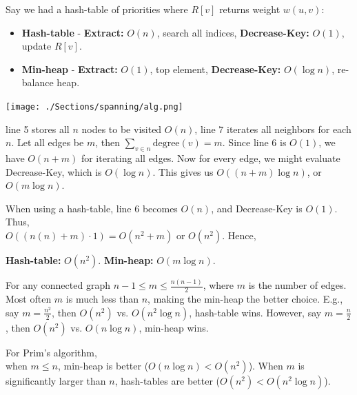 \newpage
\begin{Proof}
    Say we had a hash-table of priorities where $R[v]$ returns weight $w(u,v)$:
    \begin{itemize}
        \item \textbf{Hash-table} - \textbf{Extract:} $O(n)$, search all indices, \textbf{Decrease-Key:} $O(1)$, update $R[v]$.
        \item \textbf{Min-heap} - \textbf{Extract:} $O(1)$, top element, \textbf{Decrease-Key:} $O(\log n)$, re-balance heap.
    \end{itemize}
    \begin{center}
    \texttt{[image: ./Sections/spanning/alg.png]}
    \end{center}

    line 5 stores all $n$ nodes to be visited $O(n)$, line 7 iterates all neighbors for each $n$. Let all edges be $m$, then $\sum_{v \in n} \text{degree}(v)=m$.
    Since line 6 is $O(1)$, we have $O(n+m)$ for iterating all edges. Now for every edge, we might evaluate Decrease-Key, which is $O(\log n)$. This gives us 
    $O((n+m)\log n)$, or $O(m\log n)$.
    
    When using a hash-table, line 6 becomes $O(n)$, and Decrease-Key is $O(1)$. Thus,\\
    $O((n(n)+m)\cdot 1)= O(n^2+m)$ or $O(n^2)$. Hence,

    \begin{center}
        \textbf{Hash-table:} $O(n^2)$. \textbf{Min-heap:} $O(m\log n)$.\\
    \end{center}

    \noindent
    For any connected graph $n-1\leq m \leq \frac{n(n-1)}{2}$, where $m$ is the number of edges. Most often $m$ is much less than $n$, making the min-heap the better choice.
    E.g., say $m=\frac{n^2}{2}$, then $O(n^2)$ vs. $O(n^2\log n)$, hash-table wins. However, say $m=\frac{n}{2}$, then $O(n^2)$ vs. $O(n\log n)$, min-heap wins.
\end{Proof}

\begin{theo}

    For Prim's algorithm,\\
    when $m \leq n$, min-heap is better ($O(n\log n)<O(n^2)$). When $m$ is significantly larger than $n$, hash-tables are better ($O(n^2)<O(n^2\log n)$).
\end{theo}
\newpage
